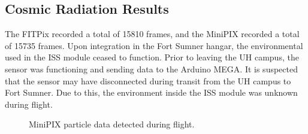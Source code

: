 \subsection{Cosmic Radiation Results}
\label{sec:Cosmic-Radiation-Results}

The FITPix recorded a total of 15810 frames, and the MiniPIX recorded a total of 15735 frames.
Upon integration in the Fort Sumner hangar, the environmental used in the ISS module ceased to function.
Prior to leaving the UH campus, the sensor was functioning and sending data to the Arduino MEGA.
It is suspected that the sensor may have disconnected during transit from the UH campus to Fort Sumner.
Due to this, the environment inside the ISS module was unknown during flight.

\begin{figure}[h!]
\hfill
{}
\hfill
{}
\hfill
\caption{MiniPIX particle data detected during flight.}
\label{fig:minipix-data}
\end{figure}

